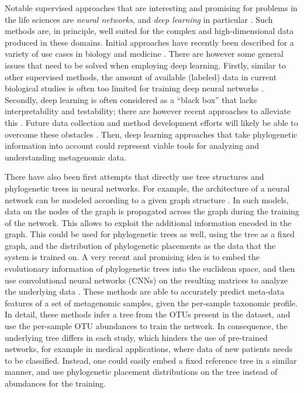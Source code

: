 Notable supervised approaches that are interesting and promising for problems in the life sciences
are \emph{neural networks}, and \emph{deep learning} in particular \cite{Skansi2018}.
Such methods are, in principle, well suited for the complex and high-dimensional data produced in these domains.
Initial approaches have recently been described
for a variety of use cases in biology and medicine \cite{Mamoshina2016,Min2017,Ching2018}.
There are however some general issues that need to be solved when employing deep learning.
Firstly, similar to other supervised methods, the amount of available (labeled) data in current biological studies
is often too limited for training deep neural networks \cite{Min2017,Ching2018}.
Secondly, deep learning is often considered as a ``black box'' that lacks interpretability and testability;
there are however recent approaches to alleviate this \cite{Min2017,Reiman2018,Wainberg2018}.
Future data collection and method development efforts will likely be able to overcome these obstacles \cite{Wainberg2018}.
Then, deep learning approaches that take phylogenetic information into account
could represent viable tools for analyzing and understanding metagenomic data.

There have also been first attempts that directly use tree structures and phylogenetic trees in neural networks.
For example, the architecture of a neural network can be modeled
according to a given graph structure \cite{Scarselli2009,Bronstein2017}.
In such models, data on the nodes of the graph is propagated across the graph during the training of the network.
This allows to exploit the additional information encoded in the graph.
This could be used for phylogenetic trees as well, using the tree as a fixed graph,
and the distribution of phylogenetic placements as the data that the system is trained on.
A very recent and promising idea is to embed the evolutionary information of phylogenetic trees into the euclidean space,
and then use convolutional neural networks (CNNs) on the resulting matrices
to analyze the underlying data \cite{Fioravanti2018,Reiman2017,Reiman2018}.
These methods are able to accurately predict meta-data features of a set of metagenomic samples,
given the per-sample taxonomic profile.
In detail, these methods infer a tree from the OTUs present in the dataset,
and use the per-sample OTU abundances to train the network.
In consequence, the underlying tree differs in each study, which hinders the use of pre-trained networks,
for example in medical applications, where data of new patients needs to be classified.
Instead, one could easily embed a fixed reference tree in a similar manner,
and use phylogenetic placement distributions on the tree instead of abundances for the training.

